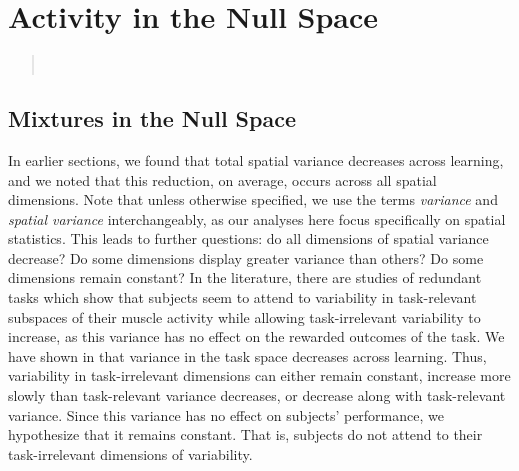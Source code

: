 \documentclass[../main.tex]{subfiles}
\begin{document}
\chapter{Activity in the Null Space}\label{chap:nullspace}

  
  \begin{quote}
    \\
  \end{quote}
  
  
  \cleardoublepage%
  
  \section{Mixtures in the Null Space}
  
  
  In earlier sections, we found that total spatial variance decreases across learning, and we noted that this reduction, on average, occurs across all spatial dimensions. Note that unless otherwise specified, we use the terms \textit{variance} and \textit{spatial variance} interchangeably, as our analyses here focus specifically on spatial statistics. This leads to further questions: do all dimensions of spatial variance decrease? Do some dimensions display greater variance than others? Do some dimensions remain constant? In the literature, there are studies of redundant tasks which show that subjects seem to attend to variability in task-relevant subspaces of their muscle activity while allowing task-irrelevant variability to increase, as this variance has no effect on the rewarded outcomes of the task\cite{Valero-Cuevas2009,scholzUncontrolledManifoldConcept1999}. We have shown in  that variance in the task space decreases across learning. Thus, variability in task-irrelevant dimensions can either remain constant, increase more slowly than task-relevant variance decreases, or decrease along with task-relevant variance. Since this variance has no effect on subjects' performance, we hypothesize that it remains constant. That is, subjects do not attend to their task-irrelevant dimensions of variability. 
  
\end{document}
